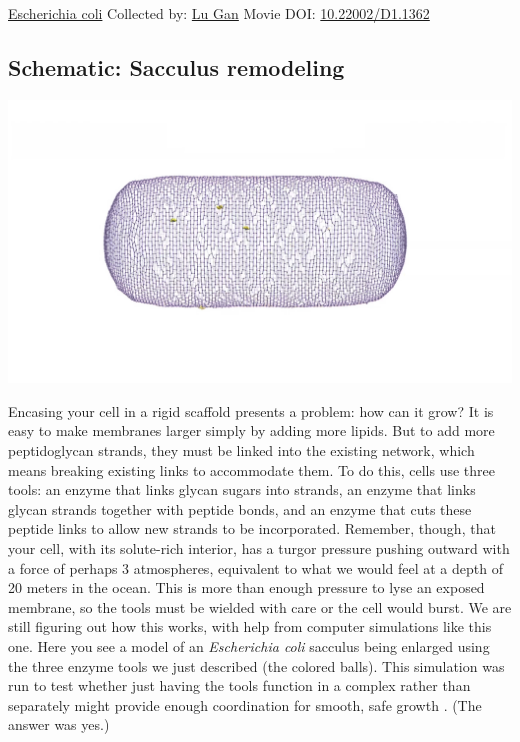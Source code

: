 \documentclass[]{tufte-book}
\begin{document}
\hypertarget{htmlwidget-60972f47b3473ce18661}{}

\label{fig:2-3a}\protect\hyperlink{tree}{Escherichia coli} Collected by: \protect\hyperlink{lu_gan}{Lu Gan} Movie DOI: \href{https://doi.org/10.22002/D1.1362}{10.22002/D1.1362}

\hypertarget{Sacculus_remodeling}{%
\subsection*{Schematic: Sacculus remodeling}\label{Sacculus_remodeling}}

\includegraphics{img/schematics/2_3_2}

Encasing your cell in a rigid scaffold presents a problem: how can it grow? It is easy to make membranes larger simply by adding more lipids. But to add more peptidoglycan strands, they must be linked into the existing network, which means breaking existing links to accommodate them. To do this, cells use three tools: an enzyme that links glycan sugars into strands, an enzyme that links glycan strands together with peptide bonds, and an enzyme that cuts these peptide links to allow new strands to be incorporated. Remember, though, that your cell, with its solute-rich interior, has a turgor pressure pushing outward with a force of perhaps 3 atmospheres, equivalent to what we would feel at a depth of 20 meters in the ocean. This is more than enough pressure to lyse an exposed membrane, so the tools must be wielded with care or the cell would burst. We are still figuring out how this works, with help from computer simulations like this one. Here you see a model of an \emph{Escherichia coli} sacculus being enlarged using the three enzyme tools we just described (the colored balls). This simulation was run to test whether just having the tools function in a complex rather than separately might provide enough coordination for smooth, safe growth \citep{nguyen2015}. (The answer was yes.)
\end{document}
